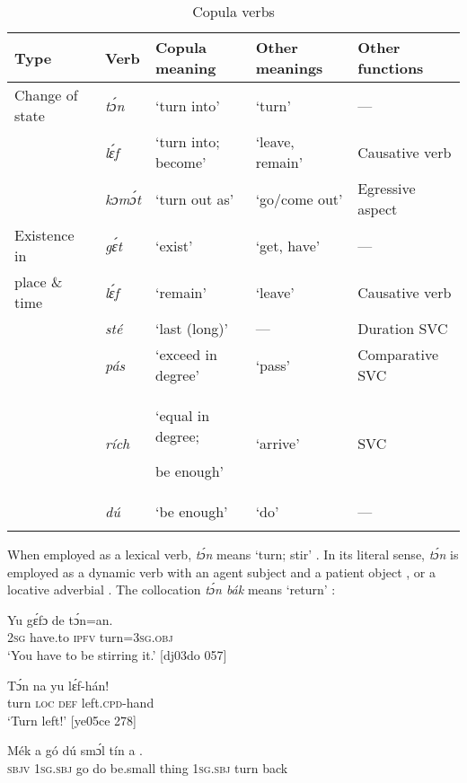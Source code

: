 \begin{table}
\caption{Copula verbs}
\label{tab:key:7.8}

\begin{tabularx}{\textwidth}{l@{~~}lQll}
\lsptoprule

Type & Verb & Copula meaning & Other meanings & Other functions\\
\midrule
Change of state & \itshape tɔ́n & ‘turn into’ & ‘turn’ & —\\
& \itshape lɛ́f & ‘turn into; become’ & ‘leave, remain’ & Causative verb\\
& \itshape kɔmɔ́t & ‘turn out as’ & ‘go/come out’ & Egressive aspect\\

\tablevspace
Existence in & \itshape gɛ́t & ‘exist’ & ‘get, have’ & —\\
place \& time & \itshape lɛ́f & ‘remain’ & ‘leave’ & Causative verb\\
& \itshape sté & ‘last (long)’ & — & Duration SVC\\
& \itshape pás & ‘exceed in degree’ & ‘pass’ & Comparative SVC\\
& \itshape rích & ‘equal in degree; 

be enough’ & ‘arrive’ & SVC\\
& \itshape dú & ‘be enough’ & ‘do’ & —\\
\lspbottomrule
\end{tabularx}
\end{table}
When employed as a lexical verb, \textit{tɔ́n} means ‘turn; stir’ . In its literal sense, \textit{tɔ́n} is employed as a dynamic verb with an agent subject and a patient object , or a locative adverbial . The collocation \textit{tɔ́n bák} means ‘return’ : 


\ea%
    \label{ex:key:795}
    \gll Yu  gɛ́fɔ    de  tɔ́n=an.\\
\textsc{2sg}  have.to  \textsc{ipfv}  turn=\textsc{3sg.obj}\\

\glt ‘You have to be stirring it.’ [dj03do 057]
\z


\ea%
    \label{ex:key:796}
    \gll Tɔ́n  na  yu  lɛ́f-hán!\\
turn  \textsc{loc}  \textsc{def}  left.\textsc{cpd}{}-hand\\

\glt ‘Turn left!’ [ye05ce 278]
\z


\ea%
    \label{ex:key:797}
    \gll Mék    a    gó  dú  smɔ́l  tín    a        .\\
\textsc{sbjv}    \textsc{1sg.sbj}  go  do  be.small  thing  \textsc{1sg.sbj}  turn    back\\

